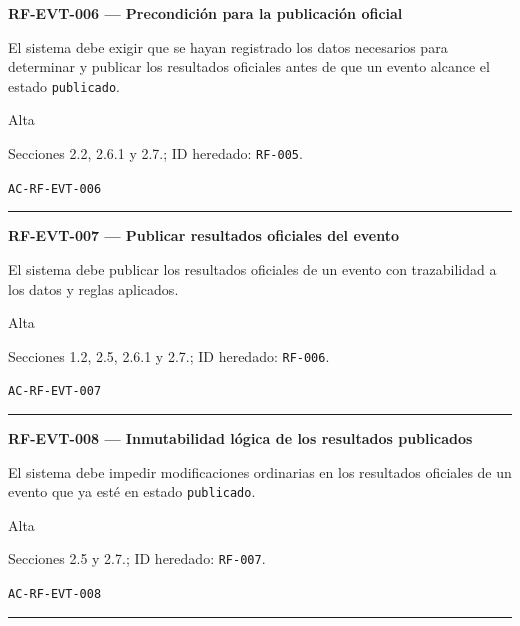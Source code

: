 \documentclass[10pt,letterpaper]{article}
\begin{document}
\noindent\textbf{RF-EVT-006 --- Precondición para la publicación oficial}\par
\begin{description}[style=nextline,leftmargin=3.15cm,labelwidth=2.8cm,font=\normalfont\bfseries]
\item[Obligación] El sistema debe exigir que se hayan registrado los datos necesarios para determinar y publicar los resultados oficiales antes de que un evento alcance el estado \texttt{publicado}.
\item[Prioridad] Alta
\item[Procedencia] Secciones 2.2, 2.6.1 y 2.7.; ID heredado: \texttt{RF-005}.
\item[Verificación] \texttt{AC-RF-EVT-006}
\end{description}
\vspace{0.25em}\hrule\vspace{0.65em}
\noindent\textbf{RF-EVT-007 --- Publicar resultados oficiales del evento}\par
\begin{description}[style=nextline,leftmargin=3.15cm,labelwidth=2.8cm,font=\normalfont\bfseries]
\item[Obligación] El sistema debe publicar los resultados oficiales de un evento con trazabilidad a los datos y reglas aplicados.
\item[Prioridad] Alta
\item[Procedencia] Secciones 1.2, 2.5, 2.6.1 y 2.7.; ID heredado: \texttt{RF-006}.
\item[Verificación] \texttt{AC-RF-EVT-007}
\end{description}
\vspace{0.25em}\hrule\vspace{0.65em}
\noindent\textbf{RF-EVT-008 --- Inmutabilidad lógica de los resultados publicados}\par
\begin{description}[style=nextline,leftmargin=3.15cm,labelwidth=2.8cm,font=\normalfont\bfseries]
\item[Obligación] El sistema debe impedir modificaciones ordinarias en los resultados oficiales de un evento que ya esté en estado \texttt{publicado}.
\item[Prioridad] Alta
\item[Procedencia] Secciones 2.5 y 2.7.; ID heredado: \texttt{RF-007}.
\item[Verificación] \texttt{AC-RF-EVT-008}
\end{description}
\vspace{0.25em}\hrule\vspace{0.65em}
\end{document}
